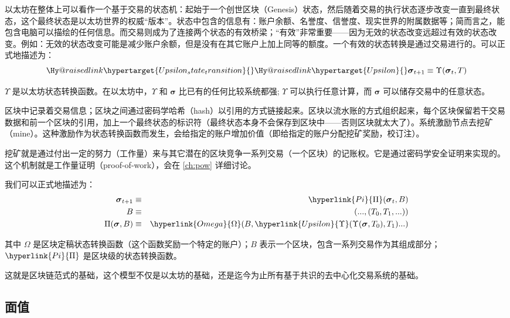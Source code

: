 \documentclass[9pt,oneside]{amsart}
\makeatletter
\newcommand{\linkdest}[1]{\Hy@raisedlink{\hypertarget{#1}{}}}
\makeatother
\begin{document}
\begin{multicols}{2}
以太坊在整体上可以看作一个基于交易的状态机：起始于一个创世区块（Genesis）状态，然后随着交易的执行状态逐步改变一直到最终状态，这个最终状态是以太坊世界的权威“版本”。状态中包含的信息有：账户余额、名誉度、信誉度、现实世界的附属数据等；简而言之，能包含电脑可以描绘的任何信息。而交易则成为了连接两个状态的有效桥梁；“有效”非常重要——因为无效的状态改变远超过有效的状态改变。例如：无效的状态改变可能是减少账户余额，但是没有在其它账户上加上同等的额度。一个有效的状态转换是通过交易进行的。可以正式地描述为：
\begin{equation}
\linkdest{Upsilon_state_transition}\linkdest{Upsilon}\boldsymbol{\sigma}_{t+1} \equiv \Upsilon(\boldsymbol{\sigma}_{t}, T)
\end{equation}

$\Upsilon$ 是以太坊状态转换函数。在以太坊中，$\Upsilon$ 和 $\boldsymbol{\sigma}$ 比已有的任何比较系统都强; $\Upsilon$ 可以执行任意计算，而 $\boldsymbol{\sigma}$ 可以储存交易中的任意状态。

区块中记录着交易信息；区块之间通过密码学哈希（hash）以引用的方式链接起来。区块以流水账的方式组织起来，每个区块保留若干交易数据和前一个区块的引用，加上一个最终状态的标识符（最终状态本身不会保存到区块中——否则区块就太大了）。系统激励节点去挖矿（mine）。这种激励作为状态转换函数而发生，会给指定的账户增加价值（即给指定的账户分配挖矿奖励，校订注）。

挖矿就是通过付出一定的努力（工作量）来与其它潜在的区块竞争一系列交易（一个区块）的记账权。它是通过密码学安全证明来实现的。这个机制就是工作量证明（proof-of-work），会在 \ref{ch:pow} 详细讨论。

我们可以正式地描述为：
\begin{eqnarray}
\boldsymbol{\sigma}_{t+1} & \equiv & \hyperlink{Pi}{\Pi}(\boldsymbol{\sigma}_{t}, B) \\
B & \equiv & (..., (T_0, T_1, ...) ) \\
\Pi(\boldsymbol{\sigma}, B) & \equiv & \hyperlink{Omega}{\Omega}(B, \hyperlink{Upsilon}{\Upsilon}(\Upsilon(\boldsymbol{\sigma}, T_0), T_1) ...)
\end{eqnarray}

其中 \hyperlink{Omega}{$\Omega$} 是区块定稿状态转换函数（这个函数奖励一个特定的账户）；\hyperlink{block}{$B$} 表示一个区块，包含一系列交易作为其组成部分；$\hyperlink{Pi}{\Pi}$ 是区块级的状态转换函数。

这就是区块链范式的基础，这个模型不仅是以太坊的基础，还是迄今为止所有基于共识的去中心化交易系统的基础。

\subsection{面值}


\end{multicols}
\end{document}
